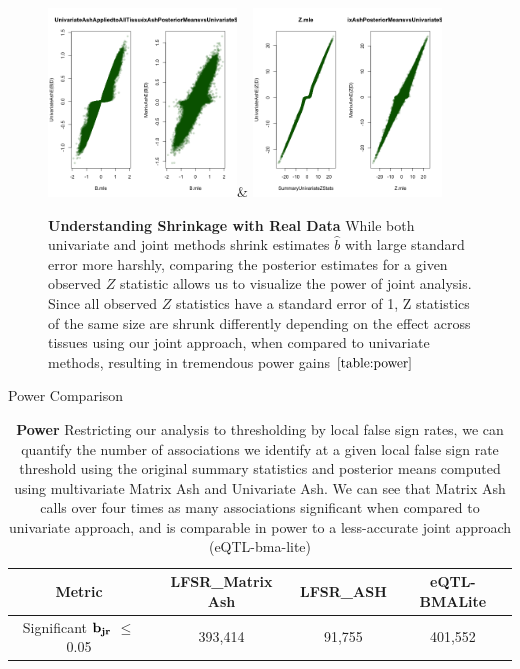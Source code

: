 \begin{figure}[htbp]
\includegraphics[width=5cm]{Figures/comparebeta.png}&
\includegraphics[width=5cm]{Figures/comparez.png}\\
\caption{\textbf{Understanding Shrinkage with Real Data} While both univariate and joint methods shrink estimates $\hat{b}$ with large standard error more harshly, comparing the posterior estimates for a given observed $Z$ statistic allows us to visualize the power of joint analysis. Since all observed $Z$ statistics have a standard error of 1, Z statistics of the same size are shrunk differently depending on  the effect across tissues using our joint approach, when compared to univariate methods, resulting in tremendous power gains $\ref{table:power}$}
\end{figure}\newline

\begin{table}[ht]
\caption{Power Comparison}
\centering
\begin{tabular}{c c c c}
\hline\hline
Metric & LFSR_{Matrix Ash} & LFSR_{ASH}&eQTL-BMALite \\ [0.5ex] %
\hline
Significant $\bf{b}_{jr}$ $\leq$ 0.05%
&393,414 & 91,755&401,552\\
\hline
\end{tabular}
\caption{\textbf{Power} Restricting our analysis to thresholding by local false sign rates, we can quantify the number of associations we identify at a given local false sign rate threshold using the original summary statistics and posterior means computed using multivariate Matrix Ash and Univariate Ash. We can see that Matrix Ash calls over four times as many associations significant when compared to univariate approach, and is comparable in power to a less-accurate joint approach (eQTL-bma-lite)}
\label{table:power}
\end{table}\newline

